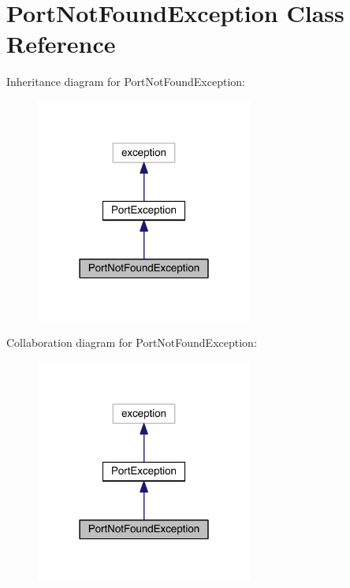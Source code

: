 \hypertarget{class_port_not_found_exception}{}\section{Port\+Not\+Found\+Exception Class Reference}
\label{class_port_not_found_exception}


Inheritance diagram for Port\+Not\+Found\+Exception\+:
\nopagebreak
\begin{figure}[H]
\begin{center}
\leavevmode
\includegraphics[width=202pt]{class_port_not_found_exception__inherit__graph}
\end{center}
\end{figure}


Collaboration diagram for Port\+Not\+Found\+Exception\+:
\nopagebreak
\begin{figure}[H]
\begin{center}
\leavevmode
\includegraphics[width=202pt]{class_port_not_found_exception__coll__graph}
\end{center}
\end{figure}
